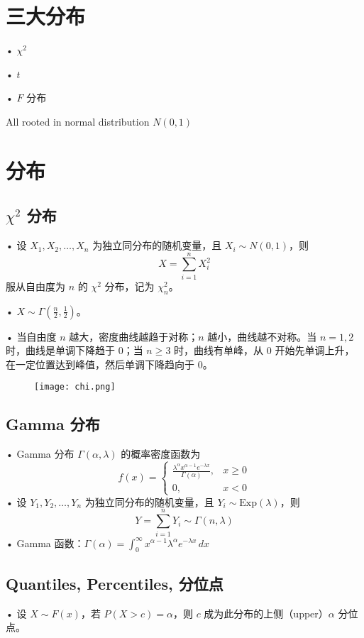 \documentclass[UTF8]{report}
\theoremstyle{MyLineTheoremStyle} %
\theoremstyle{MyBlockTheoremStyle} %
\theoremstyle{MySubsubsectionStyle} %
\begin{document}
\section{三大分布}
• $\chi^2$\par
• $t$\par
• $F$ 分布\par
All rooted in normal distribution $N(0,1)$


\section{分布}
\subsection{$\chi^2$ 分布}
• 设 $X_1, X_2, \ldots, X_n$ 为独立同分布的随机变量，且 $X_i \sim N(0,1)$，则
\[
X = \sum_{i=1}^{n} X_i^2
\]
服从自由度为 $n$ 的 $\chi^2$ 分布，记为 $\chi^2_n$。\par
• $X \sim \Gamma\left(\frac{n}{2}, \frac{1}{2}\right)$。\par
• 当自由度 $n$ 越大，密度曲线越趋于对称；$n$ 越小，曲线越不对称。当 $n=1,2$ 时，曲线是单调下降趋于 0；当 $n \geq 3$ 时，曲线有单峰，从 0 开始先单调上升，在一定位置达到峰值，然后单调下降趋向于 0。
\begin{figure}[H]
\centering
\texttt{[image: chi.png]}
\end{figure}


\subsection{Gamma 分布}
• Gamma 分布 $\Gamma(\alpha, \lambda)$ 的概率密度函数为
\[
f(x) = \begin{cases} 
\frac{\lambda^\alpha x^{\alpha-1} e^{-\lambda x}}{\Gamma(\alpha)}, & x \geq 0 \\
0, & x < 0
\end{cases}
\]
• 设 $Y_1, Y_2, \ldots, Y_n$ 为独立同分布的随机变量，且 $Y_i \sim \text{Exp}(\lambda)$，则
\[
Y = \sum_{i=1}^{n} Y_i \sim \Gamma(n, \lambda)
\]
• Gamma 函数：$\Gamma(\alpha) = \int_{0}^{\infty} x^{\alpha-1} \lambda^{\alpha}e^{-\lambda x} \, dx$

\subsection{Quantiles, Percentiles, 分位点}
• 设 $X \sim F(x)$，若 $P(X > c) = \alpha$，则 $c$ 成为此分布的上侧（upper）$\alpha$ 分位点。
\end{document}
